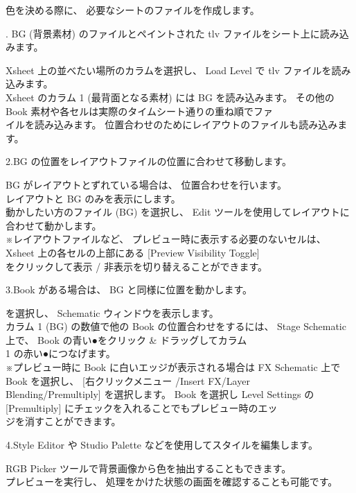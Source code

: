 \documentclass[a4paper,10pt]{article}
\begin{document}
\footnotesize
\noindent 色を決める際に、 必要なシートのファイルを作成します。\\
\par
\normalsize
{}. BG (背景素材) のファイルとペイントされた tlv ファイルをシート上に読み込みます。\par
\footnotesize
\noindent Xsheet 上の並べたい場所のカラムを選択し、 Load Level で tlv ファイルを読み込みます。\\
Xsheet のカラム 1 (最背面となる素材) には BG を読み込みます。 その他の Book 素材や各セルは実際のタイムシート通りの重ね順でファ\\
イルを読み込みます。 位置合わせのためにレイアウトのファイルも読み込みます。\\
\par
\normalsize
\noindent 2.BG の位置をレイアウトファイルの位置に合わせて移動します。\par
\footnotesize
\noindent BG がレイアウトとずれている場合は、 位置合わせを行います。\\
レイアウトと BG のみを表示にします。\\
動かしたい方のファイル (BG) を選択し、 Edit ツールを使用してレイアウトに合わせて動かします。\\
※レイアウトファイルなど、 プレビュー時に表示する必要のないセルは、 Xsheet 上の各セルの上部にある [Preview\,\,Visibility Toggle]\\
をクリックして表示 / 非表示を切り替えることができます。\\
\par
\normalsize
\noindent 3.Book がある場合は、 BG と同様に位置を動かします。\par
\footnotesize
{} を選択し、 Schematic ウィンドウを表示します。\\
カラム 1 (BG) の数値で他の Book の位置合わせをするには、 Stage Schematic 上で、 Book の青い●をクリック \& ドラッグしてカラム\\
1 の赤い●につなげます。\\
※プレビュー時に Book に白いエッジが表示される場合は FX Schematic 上で Book を選択し、 [右クリックメニュー /Insert FX/Layer\\
Blending/Premultiply] を選択します。 Book を選択し Level Settings の [Premultiply] にチェックを入れることでもプレビュー時のエッ\\
ジを消すことができます。\\
\par
\normalsize
\noindent 4.Style Editor や Studio Palette などを使用してスタイルを編集します。\par
\footnotesize
\noindent RGB Picker ツールで背景画像から色を抽出することもできます。\\
プレビューを実行し、 処理をかけた状態の画面を確認することも可能です。\\
\\
\end{document}
